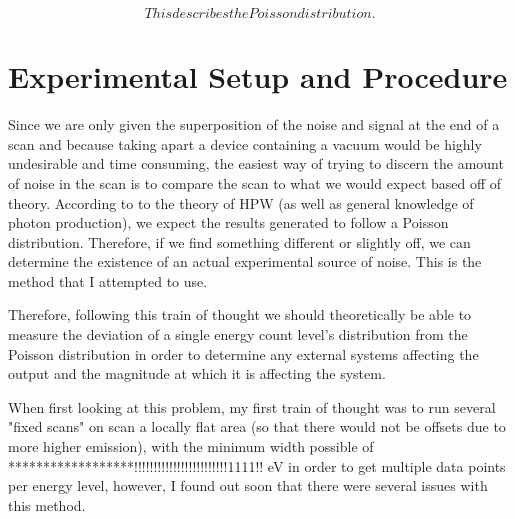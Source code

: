 \documentclass[twoside]{article}
\begin{document}
\begin{multicols}{2}
\vspace{5mm}

\begin{equation}
This describes the Poisson distribution.
\end{equation}




\section{Experimental Setup and Procedure}

Since we are only given the superposition of the noise and signal at the end of a scan and because taking apart a device containing a vacuum would be highly undesirable and time consuming, the easiest way of trying to discern the amount of noise in the scan is to compare the scan to what we would expect based off of theory.  According to to the theory of HPW (as well as general knowledge of photon production), we expect the results generated to follow a Poisson distribution.  Therefore, if we find something different or slightly off, we can determine the existence of an actual experimental source of noise. This is the method that I attempted to use.


\vspace{5mm}

Therefore, following this train of thought we should theoretically be able to measure the deviation of a single energy count level's distribution from the Poisson distribution in order to determine any external systems affecting the output and the magnitude at which it is affecting the system. 

\vspace{5mm}

When first looking at this problem, my first train of thought was to run several "fixed scans" on scan a locally flat area (so that there would not be offsets due to more higher emission), with the minimum width possible of ******************!!!!!!!!!!!!!!!!!!!!!!!!1111!! eV in order to get multiple data points per energy level, however, I found out soon that there were several issues with this method.


\end{multicols}
\end{document}

